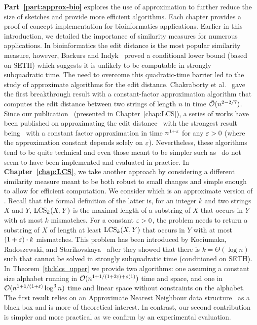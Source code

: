 \textbf{Part~\ref{part:approx-bio}} explores the use of approximation to further reduce the size of sketches and provide more efficient algorithms. Each chapter provides a proof of concept implementation for bioinformatics applications.
%
Earlier in this introduction, we detailed the importance of similarity measures for numerous applications.
In bioinformatics the edit distance is the most popular similarity measure, however, Backurs and Indyk~\cite{DBLP:conf/stoc/BackursI15} proved a conditional lower bound (based on SETH) which suggests it is unlikely to be computable in strongly subquadratic time.
The need to overcome this quadratic-time barrier led to the study of approximate algorithms for the edit distance. Chakraborty et al.~\cite{DBLP:conf/focs/ChakrabortyDGKS18} gave the first breakthrough result with a constant-factor approximation algorithm that computes the edit distance between two strings of length $n$ in time $\tilde{\mathcal{O}}(n^{2-2/7})$.
Since our publication~\cite{DBLP:conf/cpm/GourdelKRS20} (presented in Chapter~\ref{chap:LCS}), a series of works have been published on approximating the edit distance~\cite{brakensiek2020constant,koucky2020constant} with the strongest result being~\cite{andoni2020edit} with a constant factor approximation in time $n^{1+\varepsilon}$ for any $\varepsilon>0$ (where the approximation constant depends solely on $\varepsilon$).
Nevertheless, these algorithms tend to be quite technical and even those meant to be simpler such as~\cite{andoni2020simple} do not seem to have been implemented and evaluated in practice.
In \textbf{Chapter~\ref{chap:LCS}}, we take another approach by considering a different similarity measure meant to be both robust to small changes and simple enough to allow for efficient computation. We consider \kApproxLCS which is an approximate version of \kLCS. Recall that the formal definition of the latter is, for an integer $k$ and two strings $X$ and $Y$, $\mathrm{LCS}_{k}(X,Y)$ is the maximal length of a substring of $X$ that occurs in $Y$ with at most $k$ mismatches.
For a constant $\varepsilon > 0$, the \kApproxLCS problem needs to return a substring of $X$ of length at least $\mathrm{LCS}_{k}(X,Y)$ that occurs in $Y$ with at most $(1+\varepsilon) \cdot k$ mismatches. This problem has been introduced by Kociumaka, Radoszewski, and Starikovskaya~\cite{DBLP:journals/algorithmica/KociumakaRS19} after they showed that there is $k=\Theta(\log n)$ such that \kLCS cannot be solved in strongly subquadratic time (conditioned on SETH).
In Theorem~\ref{th:klcs_upper} we provide two algorithms: one assuming a constant size alphabet running in $\mathcal{O}(n^{1+ 1/(1+2\varepsilon) + o(1)})$ time and space, and one in $\mathcal{O}(n^{1+1/(1+\varepsilon)} \log^3 n)$ time and linear space without constraints on the alphabet. The first result relies on an Approximate Nearest Neighbour data structure~\cite{DBLP:conf/stoc/AndoniR15} as a black box and is more of theoretical interest. In contrast, our second contribution is simpler and more practical as we confirm by an experimental evaluation.
